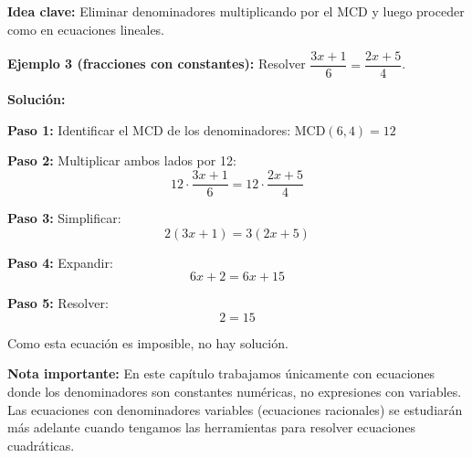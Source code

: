 
\textbf{Idea clave:} Eliminar denominadores multiplicando por el MCD y luego proceder como en ecuaciones lineales.

\begin{center}
\end{center}

\begin{example}
\textbf{Ejemplo 3 (fracciones con constantes):} Resolver $\dfrac{3x+1}{6} = \dfrac{2x+5}{4}$.

\textbf{Solución:}

\textbf{Paso 1:} Identificar el MCD de los denominadores:
MCD$(6,4) = 12$

\textbf{Paso 2:} Multiplicar ambos lados por 12:
$$12 \cdot \frac{3x+1}{6} = 12 \cdot \frac{2x+5}{4}$$

\textbf{Paso 3:} Simplificar:
$$2(3x+1) = 3(2x+5)$$

\textbf{Paso 4:} Expandir:
$$6x + 2 = 6x + 15$$

\textbf{Paso 5:} Resolver:
$$2 = 15$$

Como esta ecuación es imposible, no hay solución.
\end{example}

\textbf{Nota importante:} En este capítulo trabajamos únicamente con ecuaciones donde los denominadores son constantes numéricas, no expresiones con variables. Las ecuaciones con denominadores variables (ecuaciones racionales) se estudiarán más adelante cuando tengamos las herramientas para resolver ecuaciones cuadráticas.